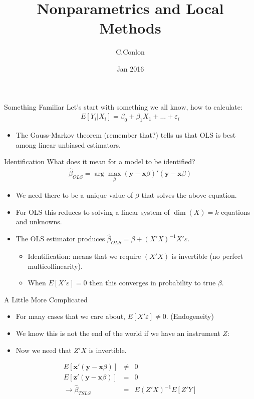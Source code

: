 \documentclass[11pt,handout,xcolor=pdftex,dvipsnames,table,mathserif]{beamer}
\title [Nonparametrics]{Nonparametrics and Local Methods}
\author{C.Conlon}
\institute{Microeconometrics}
\date{Jan 2016}
\begin{document}
\begin{frame}
\titlepage
\end{frame}


\begin{frame}{Something Familiar}
Let's start with something we all know, how to calculate:
\begin{eqnarray*}
E[Y_i | X_i ] = \beta_0 + \beta_1 X_1 + \ldots + \varepsilon_i
\end{eqnarray*}
\begin{itemize}
\item The Gauss-Markov theorem (remember that?) tells us that OLS is best among linear unbiased estimators.
\end{itemize}
\end{frame}

\begin{frame}{Identification}
What does it mean for a model to be identified?
\begin{eqnarray*}
\hat{\beta}_{OLS} = \arg \max_{\beta} (\mathbf{y} - \mathbf{x} \beta)' (\mathbf{y} - \mathbf{x} \beta)
\end{eqnarray*}
\begin{itemize}
\item We need there to be a unique value of $\beta$ that solves the above equation.
\item For OLS this reduces to solving a linear system of $\dim(X)=k$ equations and unknowns.
\item The OLS estimator produces $\hat{\beta}_{OLS} = \beta + (X'X)^{-1}X'\varepsilon$.
\begin{itemize}
\item Identification: means that we require $(X'X)$ is invertible (no perfect multicollinearity).
\item When $E[X' \varepsilon ] =0$ then this converges in probability to true $\beta$.
\end{itemize}

\end{itemize}
\end{frame}

\begin{frame}{A Little More Complicated}
\begin{itemize}
\item For many cases that we care about, $E[X' \varepsilon ] \neq 0$. (Endogeneity)
\item We know this is not the end of the world if we have an instrument $Z$:
\item Now we need that $Z'X$ is invertible.
\end{itemize}
\begin{eqnarray*}
E[\mathbf{x}' (\mathbf{y} - \mathbf{x} \beta)] &\neq& 0\\
E[\mathbf{z}' (\mathbf{y} - \mathbf{x} \beta)] &=&0\\
\rightarrow \hat{\beta}_{TSLS} &=& E(Z'X)^{-1} E[Z'Y]
\end{eqnarray*}
\end{frame}
\end{document}
